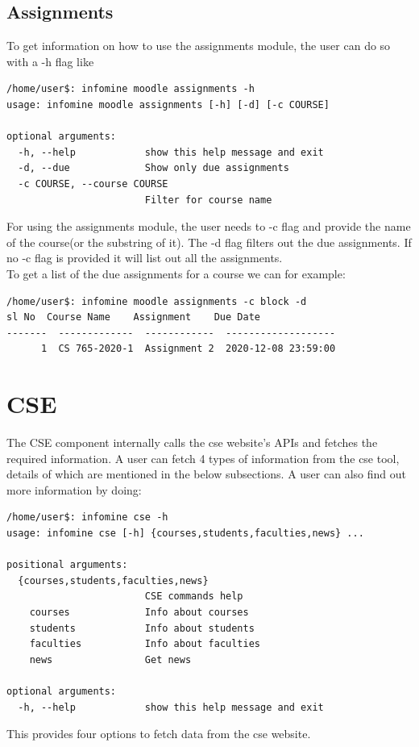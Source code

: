 \documentclass[12pt, letterpaper, twoside]{article}
\begin{document}
\subsection{Assignments}
To get information on how to use the assignments module, the user can do so with a -h flag like 
\begin{verbatim}
/home/user$: infomine moodle assignments -h
usage: infomine moodle assignments [-h] [-d] [-c COURSE]

optional arguments:
  -h, --help            show this help message and exit
  -d, --due             Show only due assignments
  -c COURSE, --course COURSE
                        Filter for course name
\end{verbatim}
For using the assignments module, the user needs to -c flag and provide the name of the course(or the substring of it). The -d flag filters out the due assignments. If no -c flag is provided it will list out all the assignments.\\
To get a list of the due assignments for a course we can for example:
\begin{verbatim}
/home/user$: infomine moodle assignments -c block -d
sl No  Course Name    Assignment    Due Date
-------  -------------  ------------  -------------------
      1  CS 765-2020-1  Assignment 2  2020-12-08 23:59:00
\end{verbatim}

\section{CSE}
The CSE component internally calls the cse website's APIs and fetches the required information. 
A user can fetch 4 types of information from the cse tool, details of which are mentioned in the below subsections.
A user can also find out more information by doing:
\begin{verbatim}
/home/user$: infomine cse -h
usage: infomine cse [-h] {courses,students,faculties,news} ...

positional arguments:
  {courses,students,faculties,news}
                        CSE commands help
    courses             Info about courses
    students            Info about students
    faculties           Info about faculties
    news                Get news

optional arguments:
  -h, --help            show this help message and exit    
\end{verbatim}
This provides four options to fetch data from the cse website.
\end{document}
